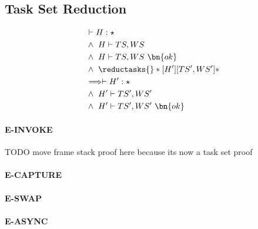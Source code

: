 \subsection{Task Set Reduction}
\begin{theorem}
    \begin{alignat}{3}
    & \vdash H : \star \label{pres-ts-prem-hstar}\\
    &\wedge\  H \vdash TS, WS \label{pres-ts-prem-tsws}\\
    &\wedge\  H \vdash TS, WS\ \bn{ok} \label{pres-ts-prem-tswsok}\\
    &\wedge\  \reductasks{}*[H']{}[TS', WS']* \label{pres-ts-prem-reduc}\\
    &\Longrightarrow \vdash H' : \star \label{pres-ts-concl-hstar}\\
    &\wedge\  H' \vdash TS', WS' \label{pres-ts-concl-tsws}\\
    &\wedge\  H' \vdash TS', WS'\ \bn{ok} \label{pres-ts-concl-tswsok}
    \end{alignat}
\end{theorem}

\paragraph{E-INVOKE}
TODO move frame stack proof here because its now a task set proof

\paragraph{E-CAPTURE}

\paragraph{E-SWAP}

\paragraph{E-ASYNC}

